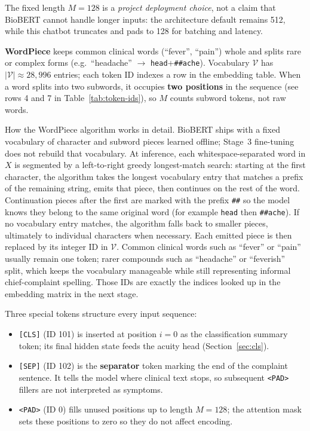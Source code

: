 \begin{remark}
The fixed length \(M=128\) is a \emph{project deployment choice}, not a claim that BioBERT cannot handle longer inputs: the architecture default remains 512, while this chatbot truncates and pads to 128 for batching and latency.
\end{remark}

\textbf{WordPiece} keeps common clinical words (``fever'', ``pain'') whole and splits rare or complex forms (e.g.\ ``headache'' \(\to\) \texttt{head}+\texttt{\#\#ache}). Vocabulary \(\mathcal{V}\) has \(|\mathcal{V}| \approx 28{,}996\) entries; each token ID indexes a row in the embedding table. When a word splits into two subwords, it occupies \textbf{two positions} in the sequence (see rows 4 and 7 in Table~\ref{tab:token-ids}), so \(M\) counts subword tokens, not raw words.

How the WordPiece algorithm works in detail. BioBERT ships with a fixed vocabulary of character and subword pieces learned offline; Stage~3 fine-tuning does not rebuild that vocabulary. At inference, each whitespace-separated word in \(X\) is segmented by a left-to-right greedy longest-match search: starting at the first character, the algorithm takes the longest vocabulary entry that matches a prefix of the remaining string, emits that piece, then continues on the rest of the word. Continuation pieces after the first are marked with the prefix \texttt{\#\#} so the model knows they belong to the same original word (for example \texttt{head} then \texttt{\#\#ache}). If no vocabulary entry matches, the algorithm falls back to smaller pieces, ultimately to individual characters when necessary. Each emitted piece is then replaced by its integer ID in \(\mathcal{V}\). Common clinical words such as ``fever'' or ``pain'' usually remain one token; rarer compounds such as ``headache'' or ``feverish'' split, which keeps the vocabulary manageable while still representing informal chief-complaint spelling. Those IDs are exactly the indices looked up in the embedding matrix in the next stage.

Three special tokens structure every input sequence:
\begin{itemize}
\item \texttt{[CLS]} (ID 101) is inserted at position \(i=0\) as the classification summary token; its final hidden state feeds the acuity head (Section~\ref{sec:cls}).
\item \texttt{[SEP]} (ID 102) is the \textbf{separator} token marking the end of the complaint sentence. It tells the model where clinical text stops, so subsequent \texttt{<PAD>} fillers are not interpreted as symptoms.
\item \texttt{<PAD>} (ID 0) fills unused positions up to length \(M=128\); the attention mask sets these positions to zero so they do not affect encoding.
\end{itemize}

